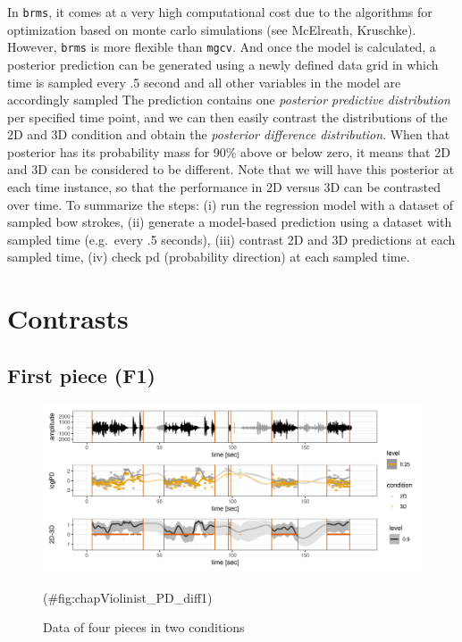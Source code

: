\documentclass[
]{book}
\theoremstyle{definition}
\theoremstyle{definition}
\theoremstyle{definition}
\theoremstyle{definition}
\theoremstyle{remark}
\begin{document}
In \texttt{brms}, it comes at a very high computational cost due to the algorithms for optimization based on monte carlo simulations (see McElreath, Kruschke). However, \texttt{brms} is more flexible than \texttt{mgcv}.
And once the model is calculated, a posterior prediction can be generated using a newly defined data grid in which time is sampled every .5 second and all other variables in the model are accordingly sampled
The prediction contains one \emph{posterior predictive distribution} per specified time point, and we can then easily contrast the distributions of the 2D and 3D condition and obtain the \emph{posterior difference distribution}.
When that posterior has its probability mass for 90\% above or below zero, it means that 2D and 3D can be considered to be different.
Note that we will have this posterior at each time instance, so that the performance in 2D versus 3D can be contrasted over time.
To summarize the steps: (i) run the regression model with a dataset of sampled bow strokes, (ii) generate a model-based prediction using a dataset with sampled time (e.g.~every .5 seconds), (iii) contrast 2D and 3D predictions at each sampled time, (iv) check pd (probability direction) at each sampled time.

\hypertarget{contrasts}{%
\section{Contrasts}\label{contrasts}}

\hypertarget{first-piece-f1}{%
\subsection{First piece (F1)}\label{first-piece-f1}}

\begin{figure}

{\centering \includegraphics[width=1\linewidth]{Figures/chapViolinist_Diff_model_F1} 

}

\caption{Data of four pieces in two conditions}(\#fig:chapViolinist_PD_diff1)
\end{figure}
\end{document}
